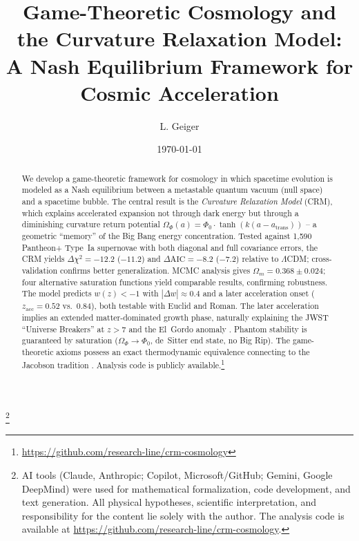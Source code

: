 \documentclass[aps,prd,twocolumn,superscriptaddress,nofootinbib]{revtex4-2}
\begin{document}

\title{Game-Theoretic Cosmology and the Curvature Relaxation Model: A Nash Equilibrium Framework for Cosmic Acceleration}

\author{L. Geiger}

\date{\today}

\begin{abstract}
We develop a game-theoretic framework for cosmology in which spacetime evolution is modeled as a Nash equilibrium between a metastable quantum vacuum (null space) and a spacetime bubble. The central result is the \textit{Curvature Relaxation Model} (CRM), which explains accelerated expansion not through dark energy but through a diminishing curvature return potential $\Omega_\Phi(a) = \Phi_0 \cdot \tanh(k(a - a_{\mathrm{trans}}))$ -- a geometric ``memory'' of the Big Bang energy concentration. Tested against 1,590 Pantheon+ Type~Ia supernovae \cite{Scolnic2022} with both diagonal and full covariance errors, the CRM yields $\Delta\chi^2 = -12.2$ ($-11.2$) and $\Delta\mathrm{AIC} = -8.2$ ($-7.2$) relative to $\Lambda$CDM; cross-validation confirms better generalization. MCMC analysis gives $\Omega_m = 0.368 \pm 0.024$; four alternative saturation functions yield comparable results, confirming robustness. The model predicts $w(z) < -1$ with $|\Delta w| \approx 0.4$ and a later acceleration onset ($z_{\mathrm{acc}} = 0.52$ vs.\ $0.84$), both testable with Euclid and Roman. The later acceleration implies an extended matter-dominated growth phase, naturally explaining the JWST ``Universe Breakers'' at $z > 7$ \cite{Labbe2023} and the El~Gordo anomaly \cite{Asencio2023}. Phantom stability is guaranteed by saturation ($\Omega_\Phi \to \Phi_0$, de~Sitter end state, no Big Rip). The game-theoretic axioms possess an exact thermodynamic equivalence connecting to the Jacobson tradition \cite{Jacobson1995}. Analysis code is publicly available.\footnote{\url{https://github.com/research-line/crm-cosmology}}
\end{abstract}


\thanks{AI tools (Claude, Anthropic; Copilot, Microsoft/GitHub; Gemini, Google DeepMind) were used for mathematical formalization, code development, and text generation. All physical hypotheses, scientific interpretation, and responsibility for the content lie solely with the author. The analysis code is available at \url{https://github.com/research-line/crm-cosmology}.}
\end{document}
